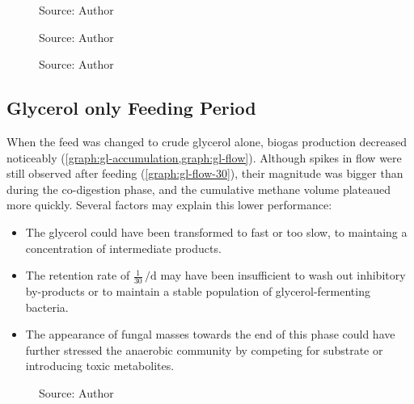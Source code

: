 \begin{figure}[H]
    \centering
    \caption{Source: Author}
    \label{graph:ra-accumulation}
\end{figure}

\begin{figure}[H]
    \centering
    \caption{Source: Author}
    \label{graph:ra-flow}
\end{figure}

\begin{figure}[H]
    \centering
    \caption{Source: Author}
    \label{graph:ra-flow-30}
\end{figure}

\subsection{Glycerol only Feeding Period}
\label{subsec:glycerol_phase}

When the feed was changed to crude glycerol alone, biogas production decreased noticeably (\cref{graph:gl-accumulation,graph:gl-flow}). Although spikes in flow were still observed after feeding (\cref{graph:gl-flow-30}), their magnitude was bigger than during the co-digestion phase, and the cumulative methane volume plateaued more quickly. Several factors may explain this lower performance:
\begin{itemize}
    \item The glycerol could have been transformed to fast or too slow, to maintaing a concentration of intermediate products.
    \item The retention rate of $\frac{1}{30}\,\unit{\per\day}$ may have been insufficient to wash out inhibitory by-products or to maintain a stable population of glycerol-fermenting bacteria.
    \item The appearance of fungal masses towards the end of this phase could have further stressed the anaerobic community by competing for substrate or introducing toxic metabolites.
\end{itemize}

\begin{figure}[H]
    \centering
    \caption{Source: Author}
    \label{graph:gl-accumulation}
\end{figure}

